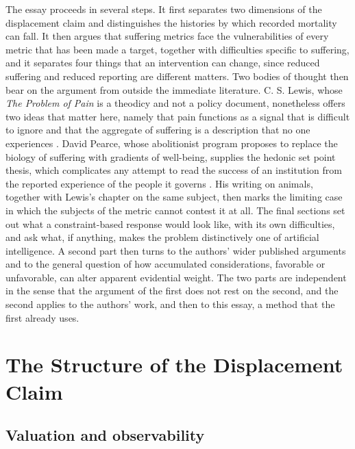 \documentclass[11pt]{article}
\begin{document}
The essay proceeds in several steps. It first separates two dimensions of the displacement claim and distinguishes the histories by which recorded mortality can fall. It then argues that suffering metrics face the vulnerabilities of every metric that has been made a target, together with difficulties specific to suffering, and it separates four things that an intervention can change, since reduced suffering and reduced reporting are different matters. Two bodies of thought then bear on the argument from outside the immediate literature. C. S. Lewis, whose \emph{The Problem of Pain} is a theodicy and not a policy document, nonetheless offers two ideas that matter here, namely that pain functions as a signal that is difficult to ignore and that the aggregate of suffering is a description that no one experiences \citep{lewis1940}. David Pearce, whose abolitionist program proposes to replace the biology of suffering with gradients of well-being, supplies the hedonic set point thesis, which complicates any attempt to read the success of an institution from the reported experience of the people it governs \citep{pearce1995}. His writing on animals, together with Lewis's chapter on the same subject, then marks the limiting case in which the subjects of the metric cannot contest it at all. The final sections set out what a constraint-based response would look like, with its own difficulties, and ask what, if anything, makes the problem distinctively one of artificial intelligence. A second part then turns to the authors' wider published arguments and to the general question of how accumulated considerations, favorable or unfavorable, can alter apparent evidential weight. The two parts are independent in the sense that the argument of the first does not rest on the second, and the second applies to the authors' work, and then to this essay, a method that the first already uses.

\section{The Structure of the Displacement Claim}

\subsection{Valuation and observability}
\end{document}
